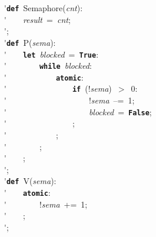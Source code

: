 \'\>\texttt{\textbf{def}}~Semaphore(\textit{cnt}):\\

\'\>~~~~\textit{result}~=~\textit{cnt};\\

\'\>;\\

\'\>\texttt{\textbf{def}}~P(\textit{sema}):\\

\'\>~~~~\texttt{\textbf{let}}~\textit{blocked}~=~\texttt{\textbf{True}}:\\

\'\>~~~~~~~~\texttt{\textbf{while}}~\textit{blocked}:\\

\'\>~~~~~~~~~~~~\texttt{\textbf{atomic}}:\\

\'\>~~~~~~~~~~~~~~~~\texttt{\textbf{if}}~(!\textit{sema})~$>$~0:\\

\'\>~~~~~~~~~~~~~~~~~~~~!\textit{sema}~--=~1;\\

\'\>~~~~~~~~~~~~~~~~~~~~\textit{blocked}~=~\texttt{\textbf{False}};\\

\'\>~~~~~~~~~~~~~~~~;\\

\'\>~~~~~~~~~~~~;\\

\'\>~~~~~~~~;\\

\'\>~~~~;\\

\'\>;\\

\'\>\texttt{\textbf{def}}~V(\textit{sema}):\\

\'\>~~~~\texttt{\textbf{atomic}}:\\

\'\>~~~~~~~~!\textit{sema}~+=~1;\\

\'\>~~~~;\\

\'\>;